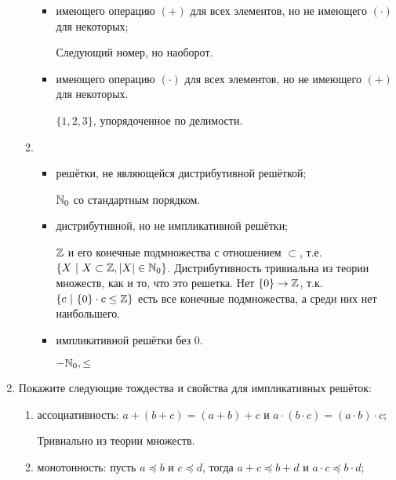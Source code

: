 \begin{enumerate}
\begin{enumerate}
\begin{itemize}
                        \item имеющего операцию $(+)$ для всех элементов, но не имеющего $(\cdot)$ для некоторых;

                              Следующий номер, но наоборот.

                        \item имеющего операцию $(\cdot)$ для всех элементов, но не имеющего $(+)$ для некоторых.

                              \(\{1, 2, 3\}\), упорядоченное по делимости.

                    \end{itemize}


              \item \begin{itemize}
                        \item решётки, не являющейся дистрибутивной решёткой;

                              \(\mathbb{N}_0\) со стандартным порядком.

                        \item дистрибутивной, но не импликативной решётки;

                              \(\mathbb{Z}\) и его конечные подмножества с отношением \(\subset\), т.е. \(\{X\ |\ X\subset \mathbb{Z}, |X|\in\mathbb{N}_0\} \). Дистрибутивность тривиальна из теории множеств, как и то, что это решетка. Нет \(\{0\} \to \mathbb{Z}\), т.к. \(\{c\ |\ \{0\} \cdot c \leq \mathbb{Z}\} \) есть все конечные подмножества, а среди них нет наибольшего.

                        \item импликативной решётки без 0.

                              \( - \mathbb{N}_0, \leq \)
                    \end{itemize}
          \end{enumerate}

    \item Покажите следующие тождества и свойства для импликативных решёток:
          \begin{enumerate}
              \item ассоциативность: $a + (b + c) = (a + b) + c$ и $a \cdot (b \cdot c) = (a \cdot b) \cdot c$;

                    Тривиально из теории множеств.

              \item монотонность: пусть $a \preceq b$ и $c \preceq d$, тогда $a + c \preceq b + d$ и $a \cdot c \preceq b \cdot d$;


\end{enumerate}
\end{enumerate}
